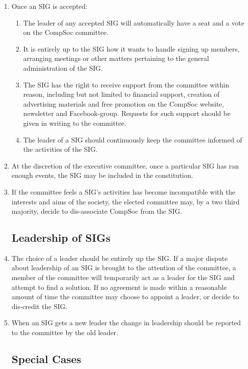 \begin{enumerate}
\item Once an SIG is accepted:
  \begin{enumerate}
  \item The leader of any accepted SIG will automatically have a seat and a vote on the CompSoc committee.
  \item It is entirely up to the SIG how it wants to handle signing up members, arranging meetings or other matters pertaining to the general administration of the SIG\@.
  \item The SIG has the right to receive support from the committee within reason, including but not limited to financial support, creation of advertising materials and free promotion on the CompSoc website, newsletter and Facebook-group. Requests for such support should be given in writing to the committee.
  \item The leader of a SIG should continuously keep the committee informed of the activities of the SIG\@.
  \end{enumerate}

\item At the discretion of the executive committee, once a particular SIG has ran enough events, the SIG may be included in the constitution.

\item If the committee feels a SIG's activities has become incompatible with the interests and aims of the society, the elected committee may, by a two third majority, decide to dis-associate CompSoc from the SIG\@.

  \subsection{Leadership of SIGs}

\item The choice of a leader should be entirely up the SIG\@. If a major dispute about leadership of an SIG is brought to the attention of the committee, a member of the committee will temporarily act as a leader for the SIG and attempt to find a solution. If no agreement is made within a reasonable amount of time the committee may choose to appoint a leader, or decide to dis-credit the SIG\@.

\item When an SIG gets a new leader the change in leadership should be reported to the committee by the old leader.

  \subsection{Special Cases}


\end{enumerate}

